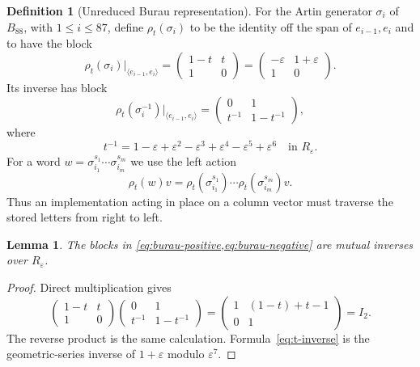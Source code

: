 \documentclass[10pt,reqno]{amsart}
\newtheorem{lemma}[theorem]{Lemma}
\theoremstyle{definition}
\newtheorem{definition}[theorem]{Definition}
\theoremstyle{remark}
\newcommand{\eps}{\varepsilon}
\begin{document}
\begin{definition}[Unreduced Burau representation]\label{def:burau}
For the Artin generator $\sigma_i$ of $B_{88}$, with $1\le i\le87$, define
$\rho_t(\sigma_i)$ to be the identity off the span of
$e_{i-1},e_i$ and to have the block
\begin{equation}\label{eq:burau-positive}
\rho_t(\sigma_i)\big|_{\langle e_{i-1},e_i\rangle}
=
\begin{pmatrix}1-t&t\\1&0\end{pmatrix}
=
\begin{pmatrix}-\eps&1+\eps\\1&0\end{pmatrix}.
\end{equation}
Its inverse has block
\begin{equation}\label{eq:burau-negative}
\rho_t(\sigma_i^{-1})\big|_{\langle e_{i-1},e_i\rangle}
=
\begin{pmatrix}0&1\\t^{-1}&1-t^{-1}\end{pmatrix},
\end{equation}
where
\begin{equation}\label{eq:t-inverse}
t^{-1}=1-\eps+\eps^2-\eps^3+\eps^4-\eps^5+\eps^6
\quad\text{in }R_\eps.
\end{equation}
For a word $w=\sigma_{i_1}^{s_1}\cdots\sigma_{i_m}^{s_m}$ we use the left
action
\begin{equation}\label{eq:word-action-order}
\rho_t(w)v=\rho_t(\sigma_{i_1}^{s_1})\cdots
\rho_t(\sigma_{i_m}^{s_m})v.
\end{equation}
Thus an implementation acting in place on a column vector must traverse the
stored letters from right to left.
\end{definition}

\begin{lemma}\label{lem:burau-inverse}
The blocks in \cref{eq:burau-positive,eq:burau-negative} are mutual inverses
over $R_\eps$.
\end{lemma}

\begin{proof}
Direct multiplication gives
\begin{equation}\label{eq:burau-inverse-check}
\begin{pmatrix}1-t&t\\1&0\end{pmatrix}
\begin{pmatrix}0&1\\t^{-1}&1-t^{-1}\end{pmatrix}
=
\begin{pmatrix}1&(1-t)+t-1\\0&1\end{pmatrix}=I_2.
\end{equation}
The reverse product is the same calculation.  Formula~\eqref{eq:t-inverse}
is the geometric-series inverse of $1+\eps$ modulo $\eps^7$.
\end{proof}
\end{document}
